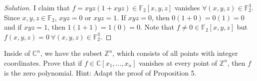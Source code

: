 \documentclass{article}
\newenvironment{problem}[2][Problem]{\begin{trivlist}
\item[\hskip \labelsep {\bfseries #1}\hskip \labelsep {\bfseries #2.}]}{\end{trivlist}}
\newenvironment{solution}{\begin{proof}[Solution]}{\end{proof}}
\begin{document}
\begin{solution}
I claim that $f = xyz(1+xyz)\in \mathbb{F}_2[x,y,z]$ vanishes $\forall (x,y,z) \in \mathbb{F}^3_2$. Since $x,y,z \in \mathbb{F}_2$, $xyz = 0$ or $xyz = 1$. If $xyz = 0$, then $0(1+0)=0(1) = 0$ and if $xyz = 1$, then $1(1+1) = 1(0) = 0$. Note that $f \not= 0 \in \mathbb{F}_2[x,y,z]$ but $f(x,y,z) = 0 \ \forall (x,y,z) \in \mathbb{F}^3_2$.
\end{solution}

\begin{problem}{(6a)}
Inside of $\mathbb{C}^n$, we have the subset $\mathbb{Z}^n$, which consists of all points with integer coordinates. Prove that if $f \in \mathbb{C}[x_1, \dots , x_n]$ vanishes at every point of $\mathbb{Z}^n$, then $f$ is the zero polynomial. Hint: Adapt the proof of Proposition 5.
\end{problem}
\end{document}
